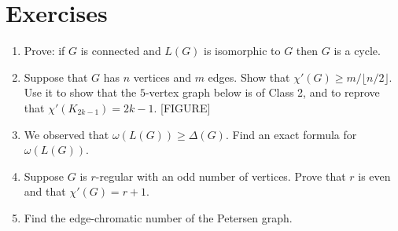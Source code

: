 


\section{Exercises}

\begin{enumerate}
\item Prove: if $G$ is connected and $L(G)$ is isomorphic to $G$ then $G$ is a cycle.
\item Suppose that $G$ has $n$ vertices and $m$ edges. Show that $\chi'(G)\geq m/\lfloor n/2\rfloor$. Use it to show that the $5$-vertex graph below is of Class 2, and to reprove that $\chi'(K_{2k-1})=2k-1$. [FIGURE]
\item We observed that $\omega(L(G))\geq\Delta(G)$. Find an exact formula for $\omega(L(G))$.
\item Suppose $G$ is $r$-regular with an odd number of vertices. Prove that $r$ is even and that $\chi'(G)=r+1$.
\item Find the edge-chromatic number of the Petersen graph.
\end{enumerate}
